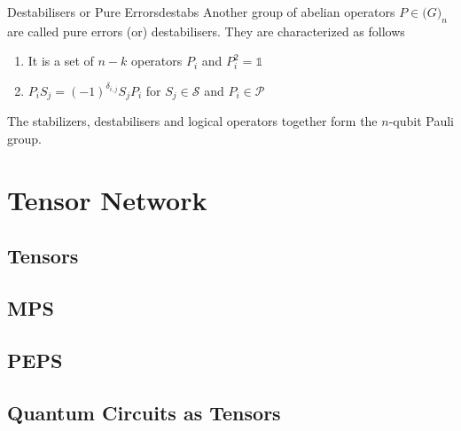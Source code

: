 \begin{boxed-defn}{Destabilisers or Pure Errors}{destabs}
Another group of abelian operators \(P \in \mathcal(G)_n\) are called pure errors (or) destabilisers. They are characterized as follows
\begin{enumerate}
    \item It is a set of \(n-k\) operators \(P_i\) and \(P_i^2 = \mathbb{1}\)
    \item \(P_i S_j = (-1)^{\delta_{i,j}} S_j P_i\) for \(S_j \in \mathcal{S}\) and \(P_i \in \mathcal{P}\)
\end{enumerate}
\end{boxed-defn}

The stabilizers, destabilisers and logical operators together form the \(n\)-qubit Pauli group.

\section{Tensor Network}
\subsection{Tensors}

\subsection{MPS}

\subsection{PEPS}


\subsection{Quantum Circuits as Tensors}